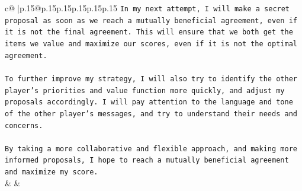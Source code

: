 \documentclass{article}
\begin{document}
{\begin{supertabular}{c@{$\;$}|p{.15\linewidth}@{}p{.15\linewidth}p{.15\linewidth}p{.15\linewidth}p{.15\linewidth}p{.15\linewidth}}
{{{\texttt{In my next attempt, I will make a secret proposal as soon as we reach a mutually beneficial agreement, even if it is not the final agreement. This will ensure that we both get the items we value and maximize our scores, even if it is not the optimal agreement.} \\
\\ 
\texttt{To further improve my strategy, I will also try to identify the other player's priorities and value function more quickly, and adjust my proposals accordingly. I will pay attention to the language and tone of the other player's messages, and try to understand their needs and concerns. } \\
\\ 
\texttt{By taking a more collaborative and flexible approach, and making more informed proposals, I hope to reach a mutually beneficial agreement and maximize my score.} \\
            }
        }
    }
    & & \\ \\


\end{supertabular}}
\end{document}

